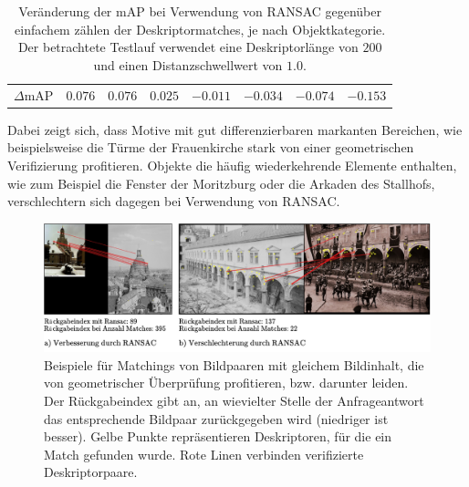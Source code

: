 \begin{table}[]
{\begin{tabular}{cccccccc}
\large{$\Delta$mAP} & \large{$0.076$} & \large{$0.076$} & \large{$0.025$} & \large{$-0.011$} & \large{$-0.034$} & \large{$-0.074$} & \large{$-0.153$}\\              
\end{tabular}
}
\setlength\tabcolsep{6pt}
\caption{Veränderung der mAP bei Verwendung von RANSAC gegenüber einfachem zählen der Deskriptormatches, je nach Objektkategorie. Der betrachtete Testlauf verwendet eine Deskriptorlänge von $200$ und einen Distanzschwellwert von $1.0$.}
\label{scoring_mAP_change_by_category}
\end{table}
Dabei zeigt sich, dass Motive mit gut differenzierbaren markanten Bereichen, wie beispielsweise die Türme der Frauenkirche stark von einer geometrischen Verifizierung profitieren. Objekte die häufig wiederkehrende Elemente enthalten, wie zum Beispiel die Fenster der Moritzburg oder die Arkaden des Stallhofs, verschlechtern sich dagegen bei Verwendung von RANSAC.
\\
\begin{figure}[h]
\includegraphics[scale=0.595]{where_ransac_shines}
\caption{Beispiele für Matchings von Bildpaaren mit gleichem Bildinhalt, die von geometrischer Überprüfung profitieren, bzw. darunter leiden. Der Rückgabeindex gibt an, an wievielter Stelle der Anfrageantwort das entsprechende Bildpaar zurückgegeben wird (niedriger ist besser). Gelbe Punkte repräsentieren Deskriptoren, für die ein Match gefunden wurde. Rote Linen verbinden verifizierte Deskriptorpaare.}
\label{where_ransac_shines}
\end{figure}

